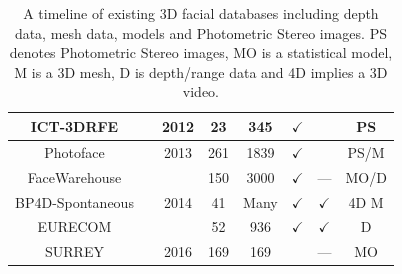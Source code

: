 \begin{table}[h]
{\begin{tabular}{@{}cccccccc@{}}
ICT-3DRFE                   &\cite{stratou2012exploring}    & 2012                  & 23          & 345         & $\checkmark$ &              & PS     \\ \midrule
Photoface                   &\cite{RefWorks:293}            & 2013                  & 261         & 1839        & $\checkmark$ &              & PS/M   \\ \midrule
FaceWarehouse               &\cite{Cao:2014gy}              & \multirow{3}{*}{2014} & 150         & 3000        & $\checkmark$ & ---          & MO/D   \\
BP4D-Spontaneous            &\cite{Zhang:2014id}            &                       & 41          & Many        & $\checkmark$ & $\checkmark$ & 4D M   \\
EURECOM                     &\cite{min2014kinectfacedb}     &                       & 52          & 936         & $\checkmark$ & $\checkmark$ & D      \\ \midrule
SURREY                      &\cite{Huber:F5Dca9zy}          & 2016                  & 169         & 169         &              & ---          & MO     \\ \bottomrule
\end{tabular}%
}
\caption{A timeline of existing 3D facial databases including depth data, mesh
         data, models and Photometric Stereo images. PS denotes Photometric
         Stereo images, MO is a statistical model, M is a 3D mesh, 
         D is depth/range data and 4D implies a 3D video.}
\label{tbl:timeline_db}
\end{table}
